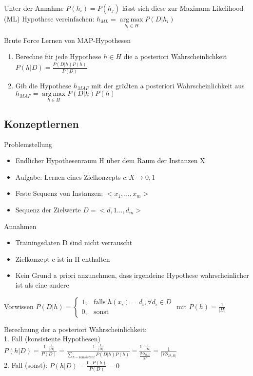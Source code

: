 \documentclass[paper=a4, fontsize=11pt]{scrartcl} %
\numberwithin{equation}{section} %
\numberwithin{figure}{section} %
\numberwithin{table}{section} %
\DeclareMathOperator*{\argmax}{arg\,max}
\begin{document}
Unter der Annahme $P(h_i) = P(h_j)$ lässt sich diese zur Maximum Likelihood (ML) Hypothese vereinfachen: $h_{ML} = \argmax\limits_{h_i \in H} P(D|h_i)$

Brute Force Lernen von MAP-Hypothesen
\begin{enumerate}
\item Berechne für jede Hypothese $h \in H$ die a posteriori Wahrscheinlichkeit $P(h|D) = \frac{P(D|h) P(h)}{P(D)}$
\item Gib die Hypothese $h_{MAP}$ mit der größten a posteriori Wahrscheinlichkeit aus $h_{MAP} = \argmax\limits_{h \in H} P(D|h) P(h)$
\end{enumerate}

\subsection{Konzeptlernen}

Problemstellung
\begin{itemize}
\item Endlicher Hypothesenraum H über dem Raum der Instanzen X
\item Aufgabe: Lernen eines Zielkonzepts $c: X \rightarrow {0,1}$
\item Feste Sequenz von Instanzen: $<x_1,...,x_m>$
\item Sequenz der Zielwerte $D = <d,1...,d_m>$
\end{itemize}

Annahmen
\begin{itemize}
\item Trainingsdaten D sind nicht verrauscht
\item Zielkonzept c ist in H enthalten
\item Kein Grund a priori anzunehmen, dass irgendeine Hypothese wahrscheinlicher ist als eine andere
\end{itemize}

Vorwissen $P(D|h) = \left\{\begin{array}{cl} 1, & \mbox{falls }h(x_i)=d_i, \forall d_i \in D\\ 0, & \mbox{sonst} \end{array}\right.$ mit $P(h) = \frac{1}{|H|}$

Berechnung der a posteriori Wahrscheinlichkeit:\\ 
1. Fall (konsistente Hypothesen) $P(h|D) = \frac{1 \cdot \frac{1}{|H|}}{P(D)} = \frac{1 \cdot \frac{1}{|H|}}{\sum\limits_{h-konsistent}P(D|h)P(h)} = \frac{1 \cdot \frac{1}{|H|}}{\frac{|VS_{H,D}}{|H|}} = \frac{1}{|VS_{H,D|}}$\\ 
2. Fall (sonst): $P(h|D) = \frac{0\cdot P(h)}{P(D)} = 0$
\end{document}
